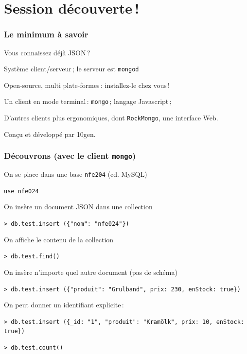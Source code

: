 \section{Session découverte\,!}


\begin{frame}
\frametitle{Le minimum à savoir}

Vous connaissez déjà JSON\,?

\begin{redbullet}
 \item Système client/serveur\,; le serveur est \texttt{mongod}
 \item Open-source, multi plate-formes\,: installez-le chez vous\,!
  \item Un client en mode terminal\,: \texttt{mongo}\,; langage Javascript\,;
  \item D'autres clients plus ergonomiques, dont \texttt{RockMongo}, une interface Web.
\end{redbullet}

Conçu et développé par 10gen.

\end{frame}

\begin{frame}
\frametitle{Découvrons (avec le client \texttt{mongo})}

On se place dans une \alert{base} \texttt{nfe204} (cd. MySQL)

\smallskip

\texttt{use nfe024}

\smallskip

On insère un \alert{document} JSON dans une \alert{collection} 

\smallskip

\texttt{> db.test.insert (\{"nom": "nfe024"\})}

\smallskip

On affiche le contenu de la collection

\smallskip

\texttt{> db.test.find() }

On insère n'importe quel autre document (pas de \alert{schéma})

\smallskip

\texttt{> db.test.insert (\{"produit": "Grulband", prix: 230, enStock: true\})}

\smallskip

On peut donner un identifiant explicite\,:

\smallskip

\texttt{> db.test.insert (\{\_id: "1", "produit": "Kramölk", prix: 10, enStock: true\})}

\smallskip

\texttt{> db.test.count()}

\end{frame}



